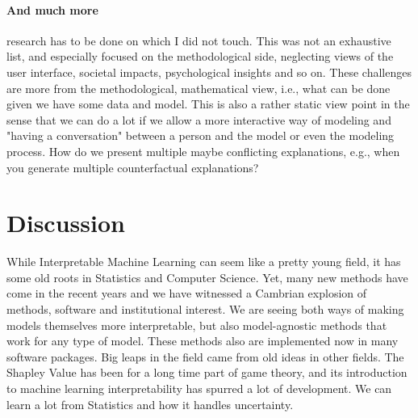 \documentclass[runningheads]{llncs}
\begin{document}
\paragraph{And much more} research has to be done on which I did not touch.
This was not an exhaustive list, and especially focused on the methodological side, neglecting views of the user interface, societal impacts, psychological insights and so on.
These challenges are more from the methodological, mathematical view, i.e., what can be done given we have some data and model.
This is also a rather static view point in the sense that we can do a lot if we allow a more interactive way of modeling and "having a conversation" between a person and the model or even the modeling process.
How do we present multiple maybe conflicting explanations, e.g., when you generate multiple counterfactual explanations?

\section{Discussion}

While Interpretable Machine Learning can seem like a pretty young field, it has some old roots in Statistics and Computer Science.
Yet, many new methods have come in the recent years and we have witnessed a Cambrian explosion of methods, software and institutional interest.
We are seeing both ways of making models themselves more interpretable, but also model-agnostic methods that work for any type of model.
These methods also are implemented now in many software packages.
Big leaps in the field came from old ideas in other fields.
The Shapley Value has been for a long time part of game theory, and its introduction to machine learning interpretability has spurred a lot of development.
We can learn a lot from Statistics and how it handles uncertainty.

%
%
%
% 
%

\vskip 0.2in


\end{document}
